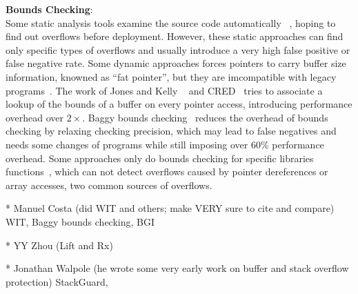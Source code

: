 \textbf{Bounds Checking}: \\ 
Some static analysis tools examine the source code automatically 
~\cite{Wagner00afirst, CSSV}, hoping to find out overflows before deployment. 
However, these static
approaches can find only specific types of overflows and usually introduce a
very high false positive or false negative rate. 
Some dynamic approaches forces pointers to carry buffer size information, knowned 
as ``fat pointer'', but they are imcompatible with legacy programs~\cite{Austinpldi1994, Cyclone, CCured}.
The work of Jones and Kelly ~\cite{Jones97backwardscompatiblebounds} and 
CRED~\cite{CRED} tries to associate a lookup of the bounds of a buffer
on every pointer access, introducing performance overhead over $2\times$.
Baggy bounds checking~\cite{overflow:Baggy} reduces the overhead of bounds checking by 
relaxing checking precision, 
which may lead to false negatives and needs some changes of programs while still imposing 
over 60\% performance overhead. 
Some approaches only do bounds checking for specific libraries 
functions~\cite{Libsafe, LibsafePlus, HeapShield}, which can not detect overflows caused by 
pointer dereferences or array accesses, two common sources of overflows.   

* Manuel Costa (did WIT and others; make VERY sure to cite and compare)
WIT, Baggy bounds checking, BGI

* YY Zhou (Lift and Rx)

* Jonathan Walpole (he wrote some very early work on buffer and stack
overflow protection)
StackGuard, 

